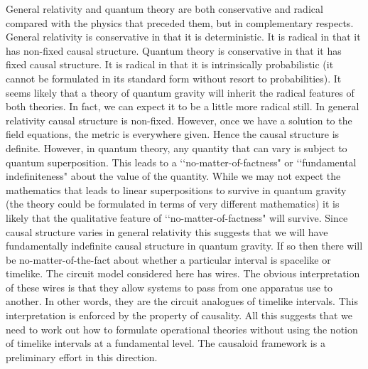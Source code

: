 \documentclass[10pt]{article}
\begin{document}
General relativity and quantum theory are both conservative and radical compared with the physics that preceded them, but in complementary respects. General relativity is conservative in that it is deterministic.  It is radical in that it has non-fixed causal structure.  Quantum theory is conservative in that it has fixed causal structure.  It is radical in that it is intrinsically probabilistic (it cannot be formulated in its standard form without resort to probabilities). It seems likely that a theory of quantum gravity will inherit the radical features of both theories.  In fact, we can expect it to be a little more radical still.  In general relativity causal structure is non-fixed. However, once we have a solution to the field equations, the metric is everywhere given.  Hence the causal structure is definite.  However, in quantum theory, any quantity that can vary is subject to quantum superposition.  This leads to a \lq\lq no-matter-of-factness" or \lq\lq fundamental indefiniteness" about the value of the quantity.  While we may not expect the mathematics that leads to linear superpositions to survive in quantum gravity (the theory could be formulated in terms of very different mathematics) it is likely that the qualitative feature of \lq\lq no-matter-of-factness" will survive.  Since causal structure varies in general relativity this suggests that we will have fundamentally indefinite causal structure in quantum gravity. If so then there will be no-matter-of-the-fact about whether a particular interval is spacelike or timelike.  The circuit model considered here has wires.   The obvious interpretation of these wires is that they allow systems to pass from one apparatus use to another.  In other words, they are the circuit analogues of timelike intervals.  This interpretation is enforced by the property of causality.  All this suggests that we need to work out how to formulate operational theories without using the notion of timelike intervals at a fundamental level.  The causaloid framework
\cite{hardy2005probability,hardy2007towards} is a preliminary effort in this direction.
\end{document}
